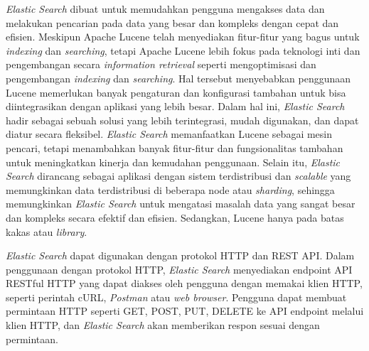 \textit{Elastic Search} dibuat untuk memudahkan pengguna mengakses data dan melakukan pencarian pada data yang besar dan kompleks dengan cepat dan efisien. Meskipun Apache Lucene telah menyediakan fitur-fitur yang bagus untuk \textit{indexing} dan \textit{searching}, tetapi Apache Lucene lebih fokus pada teknologi inti dan pengembangan secara \textit{information retrieval} seperti mengoptimisasi dan pengembangan \textit{indexing} dan \textit{searching}. Hal tersebut menyebabkan penggunaan Lucene memerlukan banyak pengaturan dan konfigurasi tambahan untuk bisa diintegrasikan dengan aplikasi yang lebih besar. Dalam hal ini, \textit{Elastic Search} hadir sebagai sebuah solusi yang lebih terintegrasi, mudah digunakan, dan dapat diatur secara fleksibel. \textit{Elastic Search} memanfaatkan Lucene sebagai mesin pencari, tetapi menambahkan banyak fitur-fitur dan fungsionalitas tambahan untuk meningkatkan kinerja dan kemudahan penggunaan. Selain itu, \textit{Elastic Search} dirancang sebagai aplikasi dengan sistem terdistribusi dan \textit{scalable} yang memungkinkan data terdistribusi di beberapa node atau \textit{sharding}, sehingga memungkinkan \textit{Elastic Search} untuk mengatasi masalah data yang sangat besar dan kompleks secara efektif dan efisien. Sedangkan, Lucene hanya pada batas kakas atau \textit{library}.

\textit{Elastic Search} dapat digunakan dengan protokol HTTP dan REST API. Dalam penggunaan dengan protokol HTTP, \textit{Elastic Search} menyediakan endpoint API RESTful HTTP yang dapat diakses oleh pengguna dengan memakai klien HTTP, seperti perintah cURL, \textit{Postman} atau \textit{web browser}. Pengguna dapat membuat permintaan HTTP seperti GET, POST, PUT, DELETE ke API endpoint melalui klien HTTP, dan \textit{Elastic Search} akan memberikan respon sesuai dengan permintaan.

